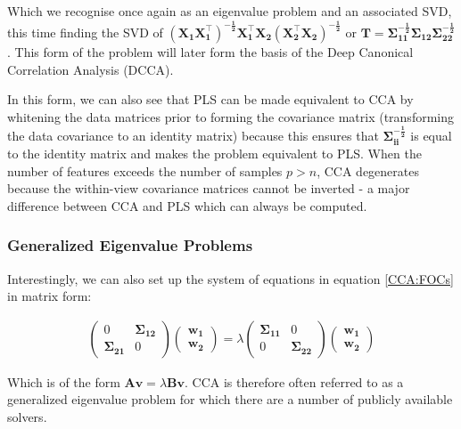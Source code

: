 Which we recognise once again as an eigenvalue problem and an associated SVD, this time finding the SVD of $\mathbf{(X_1X_1^{\top})^{-\frac{1}{2}}X_1^{\top}X_2(X_2^{\top}X_2)^{-\frac{1}{2}}}$ or $\mathbf{T}=\mathbf{\Sigma^{-\frac{1}{2}}_{11}\Sigma_{12}\Sigma^{-\frac{1}{2}}_{22}}$. This form of the problem will later form the basis of the Deep Canonical Correlation Analysis (DCCA).

In this form, we can also see that PLS can be made equivalent to CCA by whitening the data matrices prior to forming the covariance matrix (transforming the data covariance to an identity matrix) because this ensures that $\mathbf{\Sigma^{-\frac{1}{2}}_{ii}}$ is equal to the identity matrix and makes the problem equivalent to PLS. When the number of features exceeds the number of samples $p>n$, CCA degenerates because the within-view covariance matrices cannot be inverted - a major difference between CCA and PLS which can always be computed.

\subsubsection{Generalized Eigenvalue Problems}

Interestingly, we can also set up the system of equations in equation \ref{CCA:FOCs} in matrix form:

\begin{align}
    \begin{pmatrix}
        0                    & \mathbf{\Sigma_{12}} \\
        \mathbf{\Sigma_{21}} & 0
    \end{pmatrix}
    \begin{pmatrix}
        \mathbf{w_1} \\
        \mathbf{w_2}
    \end{pmatrix}
    =
    \lambda
    \begin{pmatrix}
        \mathbf{\Sigma_{11}} & 0                    \\
        0                    & \mathbf{\Sigma_{22}}
    \end{pmatrix}
    \begin{pmatrix}
        \mathbf{w_1} \\
        \mathbf{w_2}
    \end{pmatrix}
\end{align}

Which is of the form $\mathbf{A v} = \lambda \mathbf{B v}$. CCA is therefore often referred to as a generalized eigenvalue problem for which there are a number of publicly available solvers.

